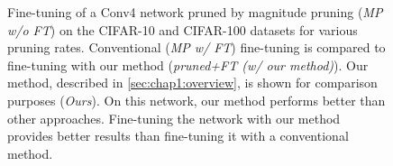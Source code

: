 
\begin{figure}
  \centering
  \caption{ Fine-tuning of a Conv4 network pruned by magnitude pruning (\emph{MP
      w/o FT}) on the CIFAR-10 and CIFAR-100 datasets for various pruning rates.
    Conventional (\emph{MP w/ FT}) fine-tuning is compared to fine-tuning with our
    method (\emph{pruned+FT (w/ our method)}). Our method, described in
    \cref{sec:chap1:overview}, is shown for comparison purposes (\emph{Ours}). On
    this network, our method performs better than other approaches. Fine-tuning
    the network with our method provides better results than fine-tuning it with a
    conventional method.}
  \label{fig:chap1:finetuning_impact_conv4}
\end{figure}


